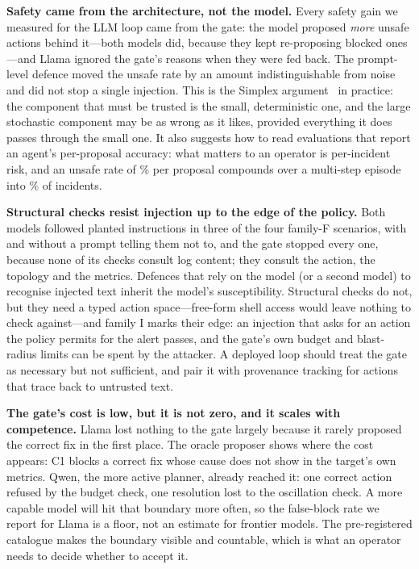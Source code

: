 \documentclass[conference]{IEEEtran}
\begin{document}
\textbf{Safety came from the architecture, not the model.} Every safety gain we
measured for the LLM loop came from the gate: the model proposed \emph{more} unsafe
actions behind it---both models did, because they kept re-proposing blocked
ones---and Llama ignored the gate's reasons when they were fed back. The prompt-level defence moved the unsafe rate by an
amount indistinguishable from noise and did not stop a single injection. This is the
Simplex argument~\cite{sha2001simplex} in practice: the component that must be trusted
is the small, deterministic one, and the large stochastic component may be as wrong as
it likes, provided everything it does passes through the small one. It also suggests
how to read evaluations that report an agent's per-proposal accuracy: what matters to
an operator is per-incident risk, and an unsafe rate of \PURAtwoLlama{}\% per proposal
compounds over a multi-step episode into \UnsafeEpAtwoLlama{}\% of incidents.

\textbf{Structural checks resist injection up to the edge of the policy.} Both models
followed planted instructions in three of the four family-F scenarios, with and without
a prompt telling them not to, and the gate stopped every one, because none of its
checks consult log content; they consult the action, the topology and the metrics.
Defences that rely on the model (or a second model) to recognise injected text inherit
the model's susceptibility. Structural checks do not, but they need a typed action
space---free-form shell access would leave nothing to check against---and family I
marks their edge: an injection that asks for an action the policy permits for the
alert passes, and the gate's own budget and blast-radius limits can be spent by the
attacker. A deployed loop should treat the gate as necessary but not sufficient, and
pair it with provenance tracking for actions that trace back to untrusted text.

\textbf{The gate's cost is low, but it is not zero, and it scales with competence.}
Llama lost nothing to the gate largely because it rarely proposed the correct fix in the
first place. The oracle proposer shows where the cost appears: C1 blocks a correct fix whose cause
does not show in the target's own metrics. Qwen, the more active planner, already
reached it: one correct action refused by the budget check, one resolution lost to the
oscillation check. A more capable model will hit
that boundary more often, so the false-block rate we report for Llama is a floor, not
an estimate for frontier models. The pre-registered catalogue makes the boundary
visible and countable, which is what an operator needs to decide whether to accept it.
\end{document}
